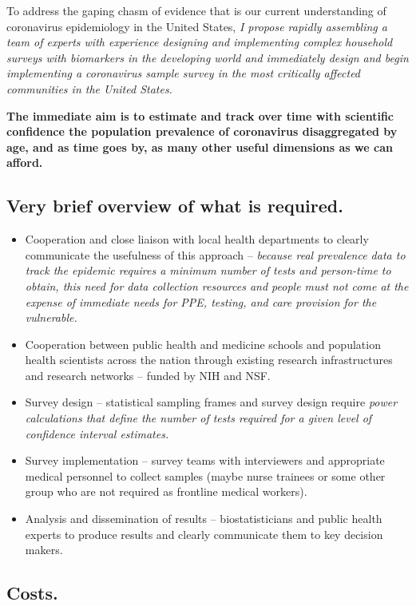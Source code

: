 \documentclass[12pt]{article}
\begin{document}
To address the gaping chasm of evidence that is our current understanding of coronavirus epidemiology in the United States, \textit{I propose rapidly assembling a team of experts with experience designing and implementing complex household surveys with biomarkers in the developing world and immediately design and begin implementing a coronavirus sample survey in the most critically affected communities in the United States.}  

\textbf{The immediate aim is to estimate and track over time with scientific confidence the population prevalence of coronavirus disaggregated by age, and as time goes by, as many other useful dimensions as we can afford.}

\subsection{Very brief overview of what is required.}
\begin{itemize}
\item Cooperation and close liaison with local health departments to clearly communicate the usefulness of this approach -- \textit{because real prevalence data to track the epidemic requires a minimum number of tests and person-time to obtain, this need for data collection resources and people must not come at the expense of immediate needs for PPE, testing, and care provision for the vulnerable.} 
\item Cooperation between public health and medicine schools and population health scientists across the nation through existing research infrastructures and research networks -- funded by NIH and NSF.
\item Survey design -- statistical sampling frames and survey design require \textit{power calculations that define the number of tests required for a given level of confidence interval estimates.}
\item Survey implementation -- survey teams with interviewers and appropriate medical personnel to collect samples (maybe nurse trainees or some other group who are not required as frontline medical workers).
\item Analysis and dissemination of results -- biostatisticians and public health experts to produce results and clearly communicate them to key decision makers.
\end{itemize}

\subsection{Costs.}
\end{document}
